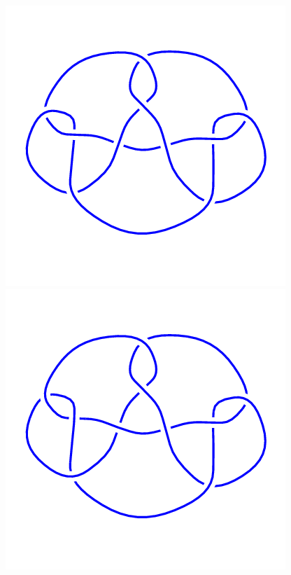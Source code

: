 \begin{figure}[H]
	\begin{minipage}[b]{.18\linewidth}
		\centering
		\includegraphics[width=\linewidth]{../data/10_137.png}
	\end{minipage}
	\begin{minipage}[b]{.18\linewidth}
		\centering
		\includegraphics[width=\linewidth]{../data/10_138.png}

\end{minipage}
\end{figure}
